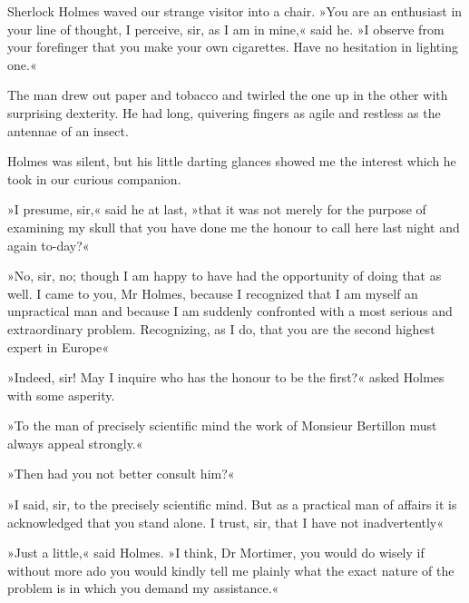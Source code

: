 Sherlock Holmes waved our strange visitor into a chair. »You are an enthusiast in your line of thought, I perceive, sir, as I am in mine,« said he. »I observe from your forefinger that you make your own cigarettes. Have no hesitation in lighting one.«

The man drew out paper and tobacco and twirled the one up in the other with surprising dexterity. He had long, quivering fingers as agile and restless as the antennae of an insect.

Holmes was silent, but his little darting glances showed me the interest which he took in our curious companion.

»I presume, sir,« said he at last, »that it was not merely for the purpose of examining my skull that you have done me the honour to call here last night and again to-day?«

»No, sir, no; though I am happy to have had the opportunity of doing that as well. I came to you, Mr Holmes, because I recognized that I am myself an unpractical man and because I am suddenly confronted with a most serious and extraordinary problem. Recognizing, as I do, that you are the second highest expert in Europe\longdash«

»Indeed, sir! May I inquire who has the honour to be the first?« asked Holmes with some asperity.


»To the man of precisely scientific mind the work of Monsieur Bertillon must always appeal strongly.«


»Then had you not better consult him?«

»I said, sir, to the precisely scientific mind. But as a practical man of affairs it is acknowledged that you stand alone. I trust, sir, that I have not inadvertently\longdash«

»Just a little,« said Holmes. »I think, Dr Mortimer, you would do wisely if without more ado you would kindly tell me plainly what the exact nature of the problem is in which you demand my assistance.«
